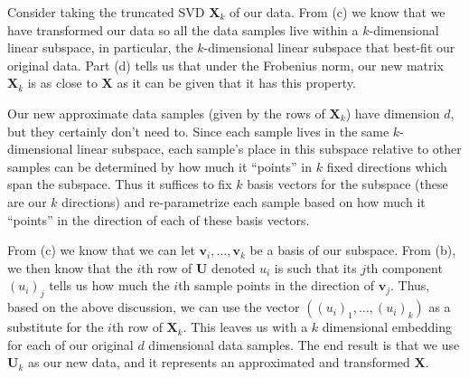 Consider taking the truncated SVD $\textbf{X}_k$ of our data. From (c) we know that we have transformed our data so all the data samples live within a $k$-dimensional linear subspace, in particular, the $k$-dimensional linear subspace that best-fit our original data. Part (d) tells us that under the Frobenius norm, our new matrix $\textbf{X}_k$ is as close to $\textbf{X}$ as it can be given that it has this property. \newline

Our new approximate data samples (given by the rows of $\textbf{X}_k$) have dimension $d$, but they certainly don't need to. Since each sample lives in the same $k$-dimensional linear subspace, each sample's place in this subspace relative to other samples can be determined by how much it ``points'' in $k$ fixed directions which span the subspace. Thus it suffices to fix $k$ basis vectors for the subspace (these are our $k$ directions) and re-parametrize each sample based on how much it ``points'' in the direction of each of these basis vectors. \newline 

From (c) we know that we can let $\textbf{v}_i, \dots,\textbf{v}_k$ be a basis of our subspace. From (b), we then know that the $i$th row of $\textbf{U}$ denoted $u_i$ is such that its $j$th component $(u_i)_{j}$ tells us how much the $i$th sample points in the direction of $\textbf{v}_j$. Thus, based on the above discussion, we can use the vector $((u_i)_1, \dots, (u_{i})_k)$ as a substitute for the $i$th row of $\textbf{X}_k$. This leaves us with a $k$ dimensional embedding for each of our original $d$ dimensional data samples. The end result is that we use $\textbf{U}_k$ as our new data, and it represents an approximated and transformed $\textbf{X}$.
